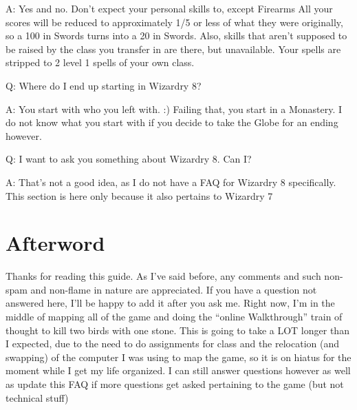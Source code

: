 \documentclass[12pt]{article}
\begin{document}
A: Yes and no. Don't expect your personal skills to, except Firearms All
your scores will be reduced to approximately 1/5 or less of what they
were originally, so a 100 in Swords turns into a 20 in Swords. Also,
skills that aren't supposed to be raised by the class you transfer in
are there, but unavailable. Your spells are stripped to 2 level 1 spells
of your own class.

Q: Where do I end up starting in Wizardry 8?

A: You start with who you left with. :) Failing that, you start in a
Monastery. I do not know what you start with if you decide to take the
Globe for an ending however.

Q: I want to ask you something about Wizardry 8. Can I?

A: That's not a good idea, as I do not have a FAQ for Wizardry 8
specifically. This section is here only because it also pertains to
Wizardry 7


\section{Afterword}\label{afterword}

Thanks for reading this guide. As I've said before, any comments and such
non-spam and non-flame in nature are appreciated. If you have a question not
answered here, I'll be happy to add it after you ask me.  Right now, I'm in
the middle of mapping all of the game and doing the ``online Walkthrough''
train of thought to kill two birds with one stone. This is going to take a
LOT longer than I expected, due to the need to do assignments for class and
the relocation (and swapping) of the computer I was using to map the game, so
it is on hiatus for the moment while I get my life organized. I can still
answer questions however as well as update this FAQ if more questions get
asked pertaining to the game (but not technical stuff)
\end{document}
